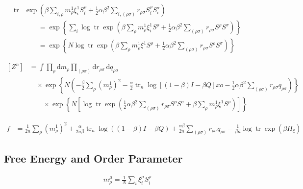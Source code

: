 \documentclass{article}
\begin{document}
\begin{align*}
\operatorname{tr} & \exp\left( \beta \sum_{i, \rho} m_{\rho}^{1} \xi_{i}^{1} S_{i}^{\rho} + \frac{1}{2} \alpha \beta^2 \sum_{i,(\rho \sigma)} r_{\rho \sigma} S_{i}^{\rho} S_{i}^{\sigma} \right) \\
& \qquad = \exp\left\{ \sum_{i} \log \operatorname{tr} \exp\left(\beta \sum_{\rho} m_{\rho}^{1} \xi_{i}^{1} S^{\rho} + \frac{1}{2} \alpha \beta^2 \sum_{(\rho \sigma)} r_{\rho \sigma} S^{\rho} S^{\sigma}\right)\right\} \\
& \qquad = \exp\left\{ N \log \operatorname{tr} \exp\left(\beta \sum_{\rho} m_{\rho}^{1} \xi^{1} S^{\rho} + \frac{1}{2} \alpha \beta^2 \sum_{(\rho \sigma)} r_{\rho \sigma} S^{\rho} S^{\sigma}\right)\right\}
\tag{7.27}
\end{align*}

\begin{align*}
\left[Z^{n}\right] &= \int \prod_{\rho} \mathrm{d}m_{\rho} \prod_{(\rho \sigma)} \mathrm{d}r_{\rho \sigma} \, \mathrm{d}q_{\rho \sigma} \\
& \quad \times \exp\left\{ N \left( -\frac{\beta}{2} \sum_{\rho} \left(m_{\rho}^{1}\right)^2 - \frac{\alpha}{2} \operatorname{tr}_{n} \log\left[ (1-\beta) I - \beta Q \right]xo - \frac{1}{2} \alpha \beta^2 \sum_{(\rho \sigma)} r_{\rho \sigma} q_{\rho \sigma} \right) \right\} \\
& \qquad \times \exp \left\{ N  \left[\log \operatorname{tr} \exp\left( \frac{1}{2} \alpha \beta^2 \sum_{(\rho \sigma)} r_{\rho \sigma} S^{\rho} S^{\sigma} + \beta \sum_{\rho} m_{\rho}^{1} \xi^{1} S^{\rho} \right) \right] \right\}
\tag{7.28}
\end{align*}

\begin{align*}
f &= \frac{1}{2n} \sum_{\rho} \left(m_{\rho}^{1}\right)^2 + \frac{\alpha}{2n\beta} \operatorname{tr}_{n} \log\left((1-\beta) I - \beta Q\right) + \frac{\alpha \beta}{2n} \sum_{(\rho \sigma)} r_{\rho \sigma} q_{\rho \sigma} - \frac{1}{\beta n} \log \operatorname{tr} \exp\left(\beta H_{\xi}\right)
\tag{7.29}
\end{align*}


\subsection{Free Energy and Order Parameter}

\begin{align*}
m_{\rho}^{\mu} = \frac{1}{N} \sum_i \xi_i^\mu S_i^\rho\tag{7.30}
\end{align*}
\end{document}
